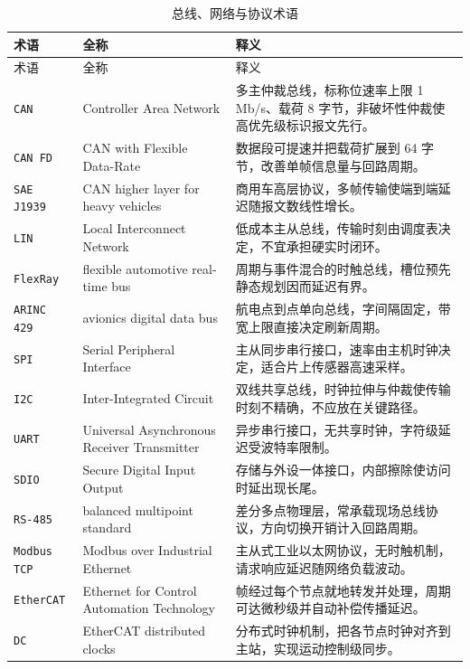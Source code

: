 \documentclass[12pt,a4paper,fontset=fandol]{ctexbook}
\newcommand{\Tp}[1]{\texttt{#1}}
\begin{document}
\begin{longtable}{@{} >{\raggedright\arraybackslash}p{} >{\raggedright\arraybackslash}p{} >{\raggedright\arraybackslash}p{}@{}}
\caption{总线、网络与协议术语}\label{tab:apA-bus} \\
\toprule
术语 & 全称 & 释义 \\
\midrule
\endfirsthead
\toprule
术语 & 全称 & 释义 \\
\midrule
\endhead
\bottomrule
\endfoot
\endlastfoot
\Tp{CAN} & Controller Area Network & 多主仲裁总线，标称位速率上限 1 Mb/s、载荷 8 字节，非破坏性仲裁使高优先级标识报文先行。 \\
\Tp{CAN FD} & CAN with Flexible Data-Rate & 数据段可提速并把载荷扩展到 64 字节，改善单帧信息量与回路周期。 \\
\Tp{SAE J1939} & CAN higher layer for heavy vehicles & 商用车高层协议，多帧传输使端到端延迟随报文数线性增长。 \\
\Tp{LIN} & Local Interconnect Network & 低成本主从总线，传输时刻由调度表决定，不宜承担硬实时闭环。 \\
\Tp{FlexRay} & flexible automotive real-time bus & 周期与事件混合的时触总线，槽位预先静态规划因而延迟有界。 \\
\Tp{ARINC 429} & avionics digital data bus & 航电点到点单向总线，字间隔固定，带宽上限直接决定刷新周期。 \\
\Tp{SPI} & Serial Peripheral Interface & 主从同步串行接口，速率由主机时钟决定，适合片上传感器高速采样。 \\
\Tp{I2C} & Inter-Integrated Circuit & 双线共享总线，时钟拉伸与仲裁使传输时刻不精确，不应放在关键路径。 \\
\Tp{UART} & Universal Asynchronous Receiver Transmitter & 异步串行接口，无共享时钟，字符级延迟受波特率限制。 \\
\Tp{SDIO} & Secure Digital Input Output & 存储与外设一体接口，内部擦除使访问时延出现长尾。 \\
\Tp{RS-485} & balanced multipoint standard & 差分多点物理层，常承载现场总线协议，方向切换开销计入回路周期。 \\
\Tp{Modbus TCP} & Modbus over Industrial Ethernet & 主从式工业以太网协议，无时触机制，请求响应延迟随网络负载波动。 \\
\Tp{EtherCAT} & Ethernet for Control Automation Technology & 帧经过每个节点就地转发并处理，周期可达微秒级并自动补偿传播延迟。 \\
\Tp{DC} & EtherCAT distributed clocks & 分布式时钟机制，把各节点时钟对齐到主站，实现运动控制级同步。 \\

\end{longtable}
\end{document}
